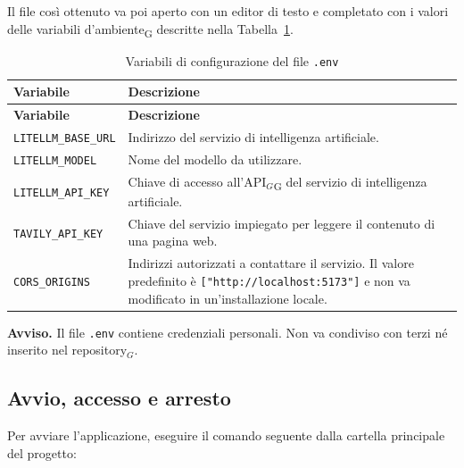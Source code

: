 \documentclass[a4paper, 10pt]{article}
\begin{document}
Il file così ottenuto va poi aperto con un editor di testo e completato con i valori delle variabili d'ambiente\textsubscript{G} descritte nella Tabella~\ref{tab:variabili-configurazione}.

\begingroup
\small
\begin{longtable}{|l|p{10.5cm}|}
    \caption{Variabili di configurazione del file \texttt{.env}}
    \label{tab:variabili-configurazione} \\
    \hline
    \textbf{Variabile} & \textbf{Descrizione} \\
    \hline
    \endfirsthead
    \hline
    \textbf{Variabile} & \textbf{Descrizione} \\
    \hline
    \endhead
    \texttt{LITELLM\_BASE\_URL} & Indirizzo del servizio di intelligenza artificiale. \\ \hline

    \texttt{LITELLM\_MODEL} & Nome del modello da utilizzare. \\ \hline

    \texttt{LITELLM\_API\_KEY} & Chiave di accesso all'API$_G$\textsubscript{G} del servizio di intelligenza artificiale. \\ \hline

    \texttt{TAVILY\_API\_KEY} & Chiave del servizio impiegato per leggere il contenuto di una pagina web. \\ \hline

    \texttt{CORS\_ORIGINS} & Indirizzi autorizzati a contattare il servizio. Il valore predefinito è \texttt{["http://localhost:5173"]} e non va modificato in un'installazione locale. \\ \hline

\end{longtable}
\endgroup

\vspace{0.5em}

\noindent
\textbf{Avviso.} Il file \texttt{.env} contiene credenziali personali. Non va condiviso con terzi né inserito nel repository$_G$.

\subsection{Avvio, accesso e arresto}
\label{sec:avvio-accesso-arresto}
Per avviare l'applicazione, eseguire il comando seguente dalla cartella principale del progetto:
\end{document}
